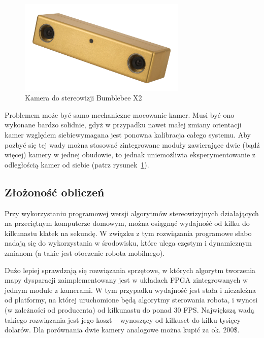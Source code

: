 \begin{figure}[h!]
\centering
\includegraphics[width=8cm]{../../Common/img/bumblebee} 
\caption{Kamera do stereowizji Bumblebee X2}
\label{fig:bumblebee}
\end{figure}

Problemem może być samo mechaniczne mocowanie kamer. Musi być ono wykonane
bardzo solidnie, gdyż w przypadku nawet małej zmiany orientacji kamer względem
siebiewymagana jest ponowna kalibracja całego systemu. Aby pozbyć się tej wady
można stosować zintegrowane moduły zawierające dwie (bądź więcej) kamery w
jednej obudowie, to jednak uniemożliwia eksperymentowanie z odległością kamer
od siebie (patrz rysunek~\ref{fig:bumblebee}).

\subsection{Złożoność obliczeń}

\cite{4670774} \cite{Hirschmuller:2008:SPS:1340087.1340245}

Przy wykorzystaniu programowej wersji algorytmów stereowizyjnych działających
na przeciętnym komputerze domowym, można osiągnąć wydajność od kilku do
kilkunastu klatek na sekundę. W związku z tym rozwiązania programowe słabo
nadają się do wykorzystania w środowisku, które ulega częstym i dynamicznym
zmianom (a takie jest otoczenie robota mobilnego).

Dużo lepiej sprawdzają się rozwiązania sprzętowe, w których algorytm tworzenia
mapy dysparacji zaimplementowany jest w układach FPGA zintegrowanych w jednym
module z kamerami. W tym przypadku wydajność jest stała i niezależna od platformy,
na której uruchomione będą algorytmy sterowania robota, i wynosi (w zależności
od producenta) od kilkunastu do ponad 30 FPS. Największą wadą takiego rozwiązania
jest jego koszt -- wynoszący od kilkuset do kilku tysięcy dolarów. Dla porównania
dwie kamery analogowe można kupić za ok. 200\$.

